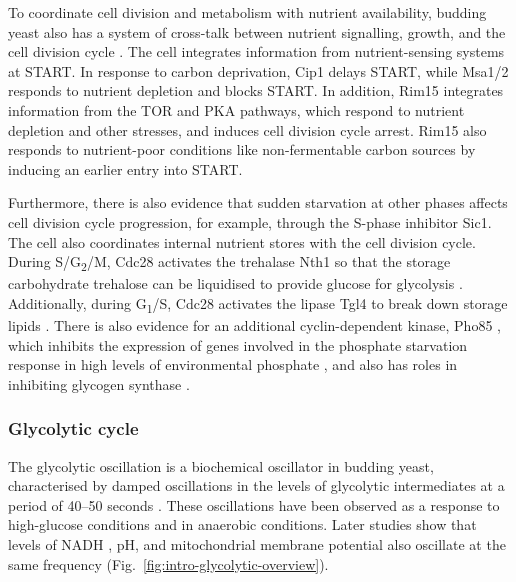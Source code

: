 To coordinate cell division and metabolism with nutrient availability, budding yeast also has a system of cross-talk between nutrient signalling, growth, and the cell division cycle \parencite{ewaldHowYeastCoordinates2018}.
The cell integrates information from nutrient-sensing systems at START\@.
In response to carbon deprivation, Cip1 delays START, while Msa1/2 responds to nutrient depletion and blocks START\@.
In addition, Rim15 integrates information from the TOR and PKA pathways, which respond to nutrient depletion and other stresses, and induces cell division cycle arrest.
Rim15 also responds to nutrient-poor conditions like non-fermentable carbon sources by inducing an earlier entry into START\@.

Furthermore, there is also evidence that sudden starvation at other phases affects cell division cycle progression, for example, through the S-phase inhibitor Sic1.
The cell also coordinates internal nutrient stores with the cell division cycle.
During S/G\textsubscript{2}/M, Cdc28 activates the trehalase Nth1 so that the storage carbohydrate trehalose can be liquidised to provide glucose for glycolysis \parencite{ewaldYeastCyclinDependentKinase2016}.
Additionally, during G\textsubscript{1}/S, Cdc28 activates the lipase Tgl4 to break down storage lipids \parencite{kuratCdk1Cdc28DependentActivation2009}.
There is also evidence for an additional cyclin-dependent kinase, Pho85 \parencite{huangPho85MultifunctionalCyclindependent2007}, which inhibits the expression of genes involved in the phosphate starvation response in high levels of environmental phosphate \parencite{oneillRegulationPHO4Nuclear1996}, and also has roles in inhibiting glycogen synthase \parencite{wilsonSubstrateTargetingYeast1999}.


\subsubsection{Glycolytic cycle}
\label{subsubsec:intro-glycolytic}

The glycolytic oscillation is a biochemical oscillator in budding yeast, characterised by damped  oscillations in the levels of glycolytic intermediates at a period of 40--50 seconds  \parencite{ghoshOscillationsGlycolyticIntermediates1964}.
These oscillations have been observed as a response to high-glucose conditions and in anaerobic conditions.
Later studies show that levels of NADH \parencite{lloydSaccharomycesCerevisiaeOscillatory2019, olsenOscillationsYeastGlycolysis2021}, pH, and mitochondrial membrane potential \parencite{doddLiveCellImaging2017} also oscillate at the same frequency (Fig.\ \ref{fig:intro-glycolytic-overview}).

